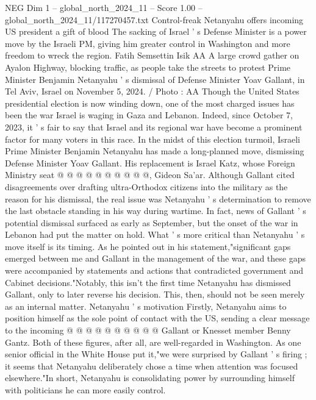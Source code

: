 \begin{textsample}{NEG Dim 1 – global\_north\_2024\_11 – Score 1.00 – global\_north\_2024\_11/117270457.txt}  \label{ex:f1_neg_118}
Control-freak Netanyahu offers incoming US president a gift of blood The sacking of Israel ' s Defense Minister is a power move by the Israeli PM, giving him greater control in Washington and more freedom to wreck the region.
Fatih Semsettin Isik AA A large crowd gather on Ayalon Highway, blocking traffic, as people take the streets to protest Prime Minister Benjamin Netanyahu ' s dismissal of Defense Minister Yoav Gallant, in Tel Aviv, Israel on November 5, 2024. / Photo : AA Though the United States presidential election is now winding down, one of the most charged issues has been the war Israel is waging in Gaza and Lebanon.
Indeed, since October 7, 2023, it ' s fair to say that Israel and its regional war have become a prominent factor for many voters in this race.
In the midst of this election turmoil, Israeli Prime Minister Benjamin Netanyahu has made a long-planned move, dismissing Defense Minister Yoav Gallant.
His replacement is Israel Katz, whose Foreign Ministry seat @ @ @ @ @ @ @ @ @ @, Gideon Sa'ar.
Although Gallant cited disagreements over drafting ultra-Orthodox citizens into the military as the reason for his dismissal, the real issue was Netanyahu ' s determination to remove the last obstacle standing in his way during wartime.
In fact, news of Gallant ' s potential dismissal surfaced as early as September, but the onset of the war in Lebanon had put the matter on hold.
What ' s more critical than Netanyahu ' s move itself is its timing.
As he pointed out in his statement,"significant gaps emerged between me and Gallant in the management of the war, and these gaps were accompanied by statements and actions that contradicted government and Cabinet decisions."Notably, this isn't the first time Netanyahu has dismissed Gallant, only to later reverse his decision.
This, then, should not be seen merely as an internal matter.
Netanyahu ' s motivation Firstly, Netanyahu aims to position himself as the sole point of contact with the US, sending a clear message to the incoming @ @ @ @ @ @ @ @ @ @ Gallant or Knesset member Benny Gantz.
Both of these figures, after all, are well-regarded in Washington.
As one senior official in the White House put it,"we were surprised by Gallant ' s firing ; it seems that Netanyahu deliberately chose a time when attention was focused elsewhere."In short, Netanyahu is consolidating power by surrounding himself with politicians he can more easily control.

\end{textsample}
